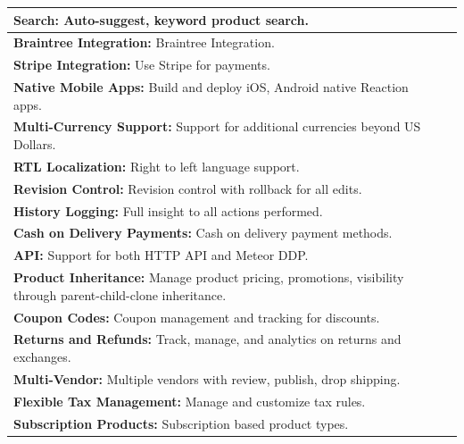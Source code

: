 \begin{table}[h!]
\begin{tabular}{ |L{0.6\paperwidth}|L{0.1\paperwidth}|}
\\ \hline
	\textbf{ Search:} Auto-suggest, keyword product search.&
	
\\ \hline
	\textbf{ Braintree Integration:} Braintree Integration.&
	
\\ \hline
	\textbf{ Stripe Integration:} Use Stripe for payments.&
	
\\ \hline
	\textbf{ Native Mobile Apps:} Build and deploy iOS, Android native Reaction apps.&
	
\\ \hline
	\textbf{ Multi-Currency Support:} Support for additional currencies beyond US Dollars.&
	
\\ \hline
	\textbf{ RTL Localization:} Right to left language support.&
	
\\ \hline
	\textbf{ Revision Control:} Revision control with rollback for all edits.&
	
\\ \hline
	\textbf{ History Logging:} Full insight to all actions performed.&
	
\\ \hline
	\textbf{ Cash on Delivery Payments:} Cash on delivery payment methods.&
	
\\ \hline
	\textbf{ API:} Support for both HTTP API and Meteor DDP.&
	
\\ \hline
	\textbf{ Product Inheritance:} Manage product pricing, promotions, visibility through parent-child-clone inheritance.&
	
\\ \hline
	\textbf{ Coupon Codes:} Coupon management and tracking for discounts.&
	
\\ \hline
	\textbf{ Returns and Refunds:} Track, manage, and analytics on returns and exchanges.&
	
\\ \hline
	\textbf{ Multi-Vendor:} Multiple vendors with review, publish, drop shipping.&
	
\\ \hline
	\textbf{ Flexible Tax Management:} Manage and customize tax rules.&
	
\\ \hline
	\textbf{ Subscription Products:} Subscription based product types.&
	

\end{tabular}
\end{table}
